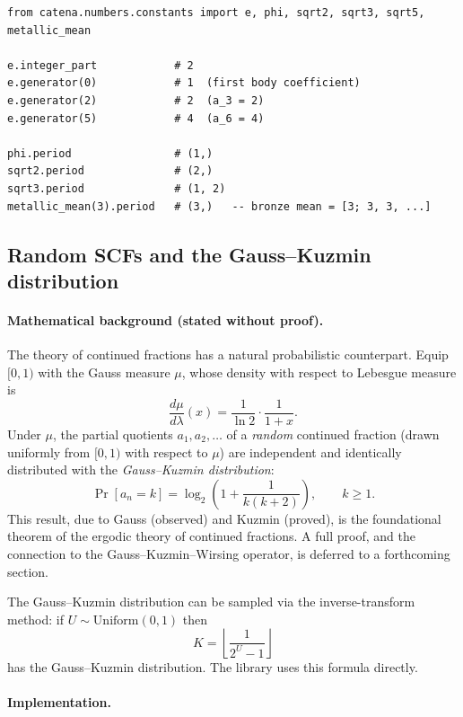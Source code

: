 \begin{catenadef}
\begin{lstlisting}[style=python]
from catena.numbers.constants import e, phi, sqrt2, sqrt3, sqrt5, metallic_mean

e.integer_part            # 2
e.generator(0)            # 1  (first body coefficient)
e.generator(2)            # 2  (a_3 = 2)
e.generator(5)            # 4  (a_6 = 4)

phi.period                # (1,)
sqrt2.period              # (2,)
sqrt3.period              # (1, 2)
metallic_mean(3).period   # (3,)   -- bronze mean = [3; 3, 3, ...]
\end{lstlisting}
\end{catenadef}

\subsection{Random SCFs and the Gauss--Kuzmin distribution}
\label{subsec:numbers-randoms}

\paragraph{Mathematical background (stated without proof).}
The theory of continued fractions has a natural probabilistic counterpart.
Equip $[0,1)$ with the Gauss measure $\mu$, whose density with respect to
Lebesgue measure is
\[
  \frac{d\mu}{d\lambda}(x) = \frac{1}{\ln 2} \cdot \frac{1}{1 + x}.
\]
Under $\mu$, the partial quotients $a_1, a_2, \ldots$ of a \emph{random}
continued fraction (drawn uniformly from $[0,1)$ with respect to
$\mu$) are independent and identically distributed with the
\emph{Gauss--Kuzmin distribution}:
\[
  \Pr[a_n = k] = \log_2\!\left(1 + \frac{1}{k(k+2)}\right),
  \qquad k \geq 1. \tag{GK}
\]
This result, due to Gauss (observed) and Kuzmin (proved), is the
foundational theorem of the ergodic theory of continued fractions.  A
full proof, and the connection to the Gauss--Kuzmin--Wirsing operator,
is deferred to a forthcoming section.

The Gauss--Kuzmin distribution can be sampled via the inverse-transform
method: if $U \sim \mathrm{Uniform}(0,1)$ then
\[
  K = \left\lfloor \frac{1}{2^U - 1} \right\rfloor \tag{IT}
\]
has the Gauss--Kuzmin distribution.  The library uses this formula
directly.

\paragraph{Implementation.}

